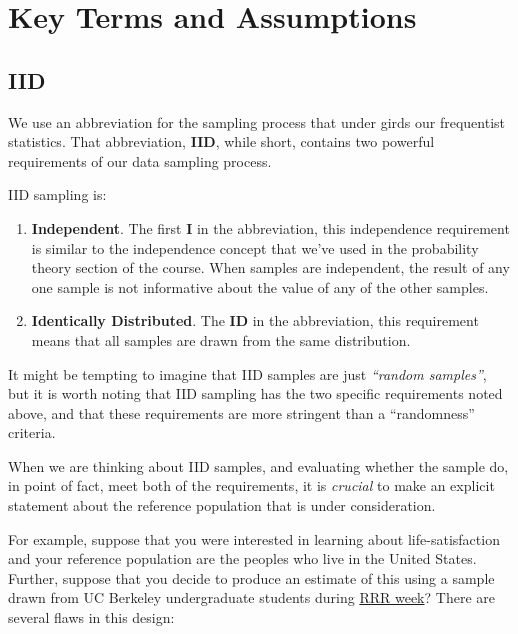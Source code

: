 \documentclass[
  letterpaper,
  DIV=11,
  numbers=noendperiod]{scrreprt}
\providecommand{\tightlist}{%
  \setlength{\itemsep}{0pt}\setlength{\parskip}{0pt}}\usepackage{longtable,booktabs,array}
\begin{document}
\section{Key Terms and Assumptions}\label{key-terms-and-assumptions}

\subsection{IID}\label{iid}

We use an abbreviation for the sampling process that under girds our
frequentist statistics. That abbreviation, \textbf{IID}, while short,
contains two powerful requirements of our data sampling process.

IID sampling is:

\begin{enumerate}
\def\labelenumi{\arabic{enumi}.}
\tightlist
\item
  \textbf{Independent}. The first \textbf{I} in the abbreviation, this
  independence requirement is similar to the independence concept that
  we've used in the probability theory section of the course. When
  samples are independent, the result of any one sample is not
  informative about the value of any of the other samples.
\item
  \textbf{Identically Distributed}. The \textbf{ID} in the abbreviation,
  this requirement means that all samples are drawn from the same
  distribution.
\end{enumerate}

It might be tempting to imagine that IID samples are just \emph{``random
samples''}, but it is worth noting that IID sampling has the two
specific requirements noted above, and that these requirements are more
stringent than a ``randomness'' criteria.

When we are thinking about IID samples, and evaluating whether the
sample do, in point of fact, meet both of the requirements, it is
\emph{crucial} to make an explicit statement about the reference
population that is under consideration.

For example, suppose that you were interested in learning about
life-satisfaction and your reference population are the peoples who live
in the United States. Further, suppose that you decide to produce an
estimate of this using a sample drawn from UC Berkeley undergraduate
students during
\href{https://teaching.berkeley.edu/sites/default/files/rrr_guidelines.pdf}{RRR
week}? There are several flaws in this design:
\end{document}
